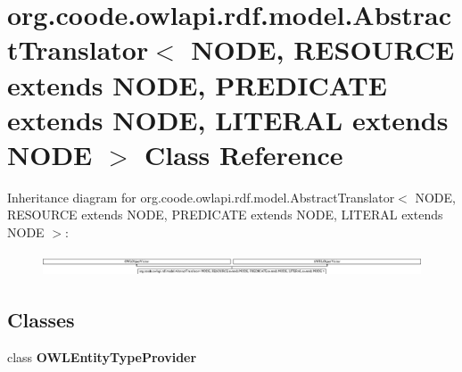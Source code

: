 \hypertarget{classorg_1_1coode_1_1owlapi_1_1rdf_1_1model_1_1_abstract_translator_3_01_n_o_d_e_00_01_r_e_s_o_ubc597564c2cb8c8d2b0139cb32f3f91c}{\section{org.\-coode.\-owlapi.\-rdf.\-model.\-Abstract\-Translator$<$ N\-O\-D\-E, R\-E\-S\-O\-U\-R\-C\-E extends N\-O\-D\-E, P\-R\-E\-D\-I\-C\-A\-T\-E extends N\-O\-D\-E, L\-I\-T\-E\-R\-A\-L extends N\-O\-D\-E $>$ Class Reference}
\label{classorg_1_1coode_1_1owlapi_1_1rdf_1_1model_1_1_abstract_translator_3_01_n_o_d_e_00_01_r_e_s_o_ubc597564c2cb8c8d2b0139cb32f3f91c}
}
Inheritance diagram for org.\-coode.\-owlapi.\-rdf.\-model.\-Abstract\-Translator$<$ N\-O\-D\-E, R\-E\-S\-O\-U\-R\-C\-E extends N\-O\-D\-E, P\-R\-E\-D\-I\-C\-A\-T\-E extends N\-O\-D\-E, L\-I\-T\-E\-R\-A\-L extends N\-O\-D\-E $>$\-:\begin{figure}[H]
\begin{center}
\leavevmode
\includegraphics[height=0.681265cm]{classorg_1_1coode_1_1owlapi_1_1rdf_1_1model_1_1_abstract_translator_3_01_n_o_d_e_00_01_r_e_s_o_ubc597564c2cb8c8d2b0139cb32f3f91c}
\end{center}
\end{figure}
\subsection*{Classes}
\begin{DoxyCompactItemize}
\item 
class {\bfseries O\-W\-L\-Entity\-Type\-Provider}
\end{DoxyCompactItemize}
